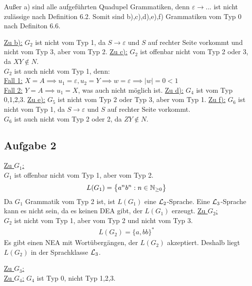 \begin{lösung}
	Außer a) sind alle aufgeführten Quadupel Grammatiken, denn $\varepsilon\to...$ ist nicht zulässige nach Definition 6.2.
	Somit sind b),c),d),e),f) Grammatiken vom Typ 0 nach Definiton 6.6.\nl
		
	\underline{Zu b):}
	$G_2$ ist nicht vom Typ 1, da $S\to\varepsilon$ und $S$ auf rechter Seite vorkommt und nicht vom Typ 3, aber vom Typ 2.\nl
	\underline{Zu c):}
	$G_2$ ist offenbar nicht vom Typ 2 oder 3, da $XY\not\in N$.\\
	$G_2$ ist auch nicht vom Typ 1, denn:\\
	\underline{Fall 1:} $X=A\implies u_1=\varepsilon,u_2=Y\implies w=\varepsilon\implies |w|=0<1$\\
	\underline{Fall 2:} $Y=A\implies u_1=X$, was auch nicht möglich ist.\nl
	\underline{Zu d):}
	$G_4$ ist vom Typ 0,1,2,3.\nl
	\underline{Zu e):}
	$G_5$ ist nicht vom Typ $2$ oder Typ 3, aber vom Typ 1.\nl
	\underline{Zu f):}
	$G_6$ ist nicht vom Typ 1, da $S\to\varepsilon$ und $S$ auf rechter Seite vorkommt.\\
	$G_6$ ist auch nicht vom Typ 2 oder 2, da $ZY\not\in N$.
\end{lösung}

\subsection{Aufgabe 2}

\begin{lösung}
	\underline{Zu $G_1$:}	\\
	$G_1$ ist offenbar nicht vom Typ 1, aber vom Typ 2.
	 \begin{align*}
	 	L(G_1)=\big\lbrace a^n b^n:n\in\mathbb{N}_{\geq0}\big\rbrace
	 \end{align*}
	 Da $G_1$ Grammatik vom Typ 2 ist, ist $L(G_1)$ eine $\mathcal{L}_2$-Sprache. 
	 Eine $\mathcal{L}_3$-Sprache kann es nicht sein, da es keinen DEA gibt, der $L(G_1)$ erzeugt.\nl
	 \underline{Zu $G_2$:}\\
	 $G_2$ ist nicht vom Typ 1, aber vom Typ 2 und nicht vom Typ 3. 
	 \begin{align*}
	 	L(G_2)=\big\lbrace a,bb\rbrace^\ast
	 \end{align*}
	 Es gibt einen NEA mit Wortübergängen, der $L(G_2)$ akzeptiert.
	 Deshalb liegt $L(G_2)$ in der Sprachklasse $\mathcal{L}_3$.
	 


	\underline{Zu $G_3$:}\\

	\underline{Zu $G_4$:}
	$G_4$ ist Typ 0, nicht Typ 1,2,3.
\end{lösung} 

